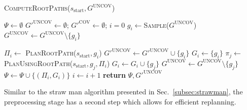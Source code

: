\documentclass[conference]{IEEEtran}
\begin{document}
\begin{algorithm}[t]
\caption{\textsc{ComputeRootPaths}($s_{\textrm{start}}, G^{\textrm{UNCOV}}$)}
\label{alg:step1}
\begin{algorithmic}[1]
\State $\Psi \leftarrow \emptyset$   
\State $G'^{\textrm{UNCOV}} \leftarrow \emptyset$; \hspace{3mm}
       $G'^{\textrm{COV}} \leftarrow \emptyset$; \hspace{3mm}
       $i = 0$
    \State $g_i \leftarrow$\textsc{Sample}($G^{\textrm{UNCOV}}$)
    \State $G^{\textrm{UNCOV}}\leftarrow G^{\textrm{UNCOV}} \setminus \{g_i\}$
    
    \State $\Pi_i \leftarrow$ \textsc{PlanRootPath}($s_{\textrm{start}}, g_i$)
      
        \State $G'^{\textrm{UNCOV}} \leftarrow G'^{\textrm{UNCOV}} \cup \{g_i\}$
    \Else
        \State $G_i \leftarrow \{ g_i \}$
            \State $\pi_j \leftarrow$\textsc{PlanUsingRootPath}($s_{\textrm{start}},g_j,\Pi_i$)
             
                \State $G_i \leftarrow G_i \cup \{g_j\}$
                \State $G^{\textrm{UNCOV}} \leftarrow G^{\textrm{UNCOV}} \setminus \{g_j\}$
            \EndIf
        \EndFor
        \State $\Psi \leftarrow \Psi \cup \{ (\Pi_i, G_i)\}$
        \State $i \leftarrow i + 1$
    \EndIf
\EndWhile
\State \textbf{return} $\Psi, G'^{\textrm{UNCOV}}$
\end{algorithmic}
\end{algorithm}


Similar to the straw man algorithm presented in Sec.~\ref{subsec:strawman}, the preprocessing stage has a second step which allows for efficient replanning.
%
\end{document}

